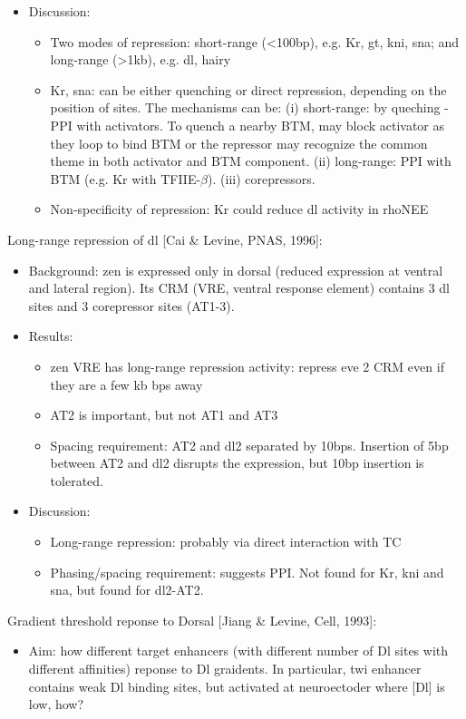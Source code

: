 \documentclass{report}
\begin{document}
\begin{enumerate}
\begin{itemize}
		\item Discussion:
		\begin{itemize}
			\item Two modes of repression: short-range (<100bp), e.g. Kr, gt, kni, sna; and long-range (>1kb), e.g. dl, hairy
			\item Kr, sna: can be either quenching or direct repression, depending on the position of sites. The mechanisms can be: (i) short-range: by queching - PPI with activators. To quench a nearby BTM, may block activator as they loop to bind BTM or the repressor may recognize the common theme in both activator and BTM component. (ii) long-range: PPI with BTM (e.g. Kr with TFIIE-$\beta$). (iii) corepressors. 
			\item Non-specificity of repression: Kr could reduce dl activity in rhoNEE
		\end{itemize}
	\end{itemize}
	
	Long-range repression of dl [Cai \& Levine, PNAS, 1996]:
	\begin{itemize}
		\item Background: zen is expressed only in dorsal (reduced expression at ventral and lateral region). Its CRM (VRE, ventral response element) contains 3 dl sites and 3 corepressor sites (AT1-3). 
		
		\item Results:
		\begin{itemize}
			\item zen VRE has long-range repression activity: repress eve 2 CRM even if they are a few kb bps away
			\item AT2 is important, but not AT1 and AT3
			\item Spacing requirement: AT2 and dl2 separated by 10bps. Insertion of 5bp between AT2 and dl2 disrupts the expression, but 10bp insertion is tolerated. 
		\end{itemize}
		
		\item Discussion:
		\begin{itemize}
			\item Long-range repression: probably via direct interaction with TC
			\item Phasing/spacing requirement: suggests PPI. Not found for Kr, kni and sna, but found for dl2-AT2. 
		\end{itemize}
	\end{itemize}
	
	Gradient threshold reponse to Dorsal [Jiang \& Levine, Cell, 1993]:
	\begin{itemize}
		\item Aim: how different target enhancers (with different number of Dl sites with different affinities) reponse to Dl graidents. In particular, twi enhancer contains weak Dl binding sites, but activated at neuroectoder where [Dl] is low, how? 
		

\end{itemize}
\end{enumerate}
\end{document}

